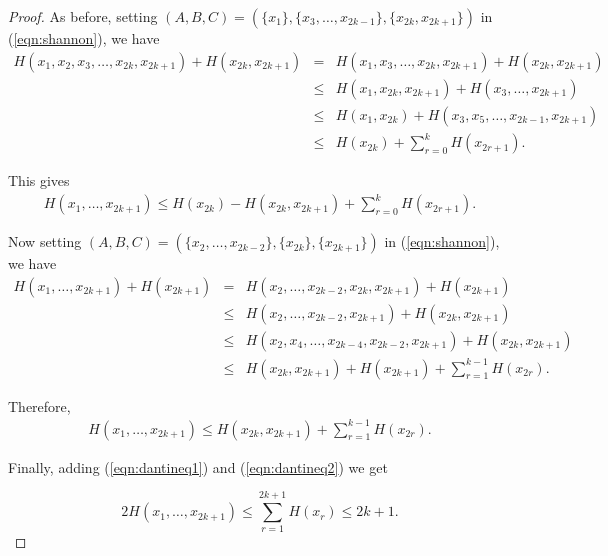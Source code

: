 \begin{proof}

 As before, setting $(A, B, C) = (\{ x_1 \}, \{ x_3, \dots, x_{2k - 1} \}, \{ x_{2k}, x_{2k + 1} \})$ in (\ref{eqn:shannon}), we have
\begin{eqnarray*}
 H(x_1, x_2, x_3, \dots, x_{2k}, x_{2k + 1}) + H(x_{2k}, x_{2k + 1}) & = & H(x_1, x_3, \dots, x_{2k}, x_{2k + 1}) + H(x_{2k}, x_{2k + 1}) \\
                           & \leq & H(x_1, x_{2k}, x_{2k + 1}) + H(x_3, \dots, x_{2k + 1}) \\
                           & \leq & H(x_1, x_{2k}) + H(x_3, x_5, \dots, x_{2k - 1}, x_{2k + 1}) \\
                           & \leq & H(x_{2k}) + \sum_{r = 0}^k H(x_{2r + 1}).
\end{eqnarray*}

This gives
\begin{eqnarray}
 H(x_1, \dots, x_{2k + 1}) \leq H(x_{2k}) - H(x_{2k}, x_{2k + 1}) + \sum_{r = 0}^k H(x_{2r + 1}) \label{eqn:dantineq1}.
\end{eqnarray}

Now setting $(A, B, C) = (\{ x_2, \dots, x_{2k - 2} \}, \{ x_{2k} \}, \{ x_{2k + 1} \})$ in (\ref{eqn:shannon}), we have
\begin{eqnarray*}
 H(x_1, \dots, x_{2k + 1}) + H(x_{2k + 1}) & = & H(x_2, \dots, x_{2k - 2}, x_{2k}, x_{2k + 1}) + H(x_{2k + 1}) \\
                           & \leq & H(x_2, \dots, x_{2k - 2}, x_{2k + 1}) + H(x_{2k}, x_{2k + 1}) \\
                           & \leq & H(x_2, x_4, \dots, x_{2k - 4}, x_{2k - 2}, x_{2k + 1}) + H(x_{2k}, x_{2k + 1}) \\
                           & \leq & H(x_{2k}, x_{2k + 1}) + H(x_{2k + 1}) + \sum_{r = 1} ^{k - 1} H(x_{2r}).
\end{eqnarray*}

Therefore,
\begin{eqnarray}
 H(x_1, \dots, x_{2k + 1}) \leq H(x_{2k}, x_{2k + 1}) + \sum_{r = 1} ^{k - 1} H(x_{2r}) \label{eqn:dantineq2}.
\end{eqnarray}

Finally, adding (\ref{eqn:dantineq1}) and (\ref{eqn:dantineq2}) we get

\[ 2H(x_1, \dots, x_{2k + 1}) \leq \sum_{r = 1} ^{2k + 1} H(x_{r}) \leq 2k + 1. \]
\end{proof}

